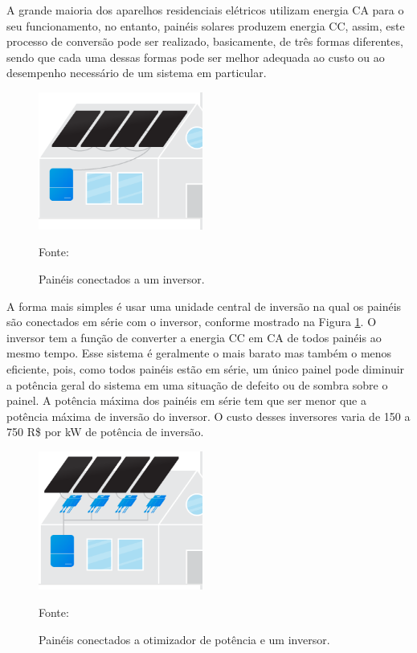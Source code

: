 A grande maioria dos aparelhos residenciais elétricos utilizam energia CA para o seu funcionamento, no entanto, painéis solares produzem energia CC, assim, este processo de conversão pode ser realizado, basicamente, de três formas diferentes, sendo que cada uma dessas formas pode ser melhor adequada ao custo ou ao desempenho necessário de um sistema em particular.

\begin{figure}[H]
    \centering
    \includegraphics[width=0.48\textwidth]{./Figuras/string.png}
    \caption{Painéis conectados a um inversor.}{Fonte: \cite{EnergySage}}
   \label{fig:string}
\end{figure}

A forma mais simples é usar uma unidade central de inversão na qual os painéis são conectados em série com o inversor, conforme mostrado na Figura \ref{fig:string}. O inversor tem a função de converter a energia CC em CA de todos painéis ao mesmo tempo. Esse sistema é geralmente o mais barato mas também o menos eficiente, pois, como todos painéis estão em série, um único painel pode diminuir a potência geral do sistema em uma situação de defeito ou de sombra sobre o painel. A potência máxima dos painéis em série tem que ser menor que a potência máxima de inversão do inversor. O custo desses inversores varia de  150 a 750 R\$ por kW de potência de inversão.

\begin{figure}[H]
    \centering
    \includegraphics[width=0.48\textwidth]{./Figuras/opt.png}
    \caption{Painéis conectados a otimizador de potência e um inversor.}{Fonte: \cite{EnergySage}}
   \label{fig:opt}
\end{figure}

